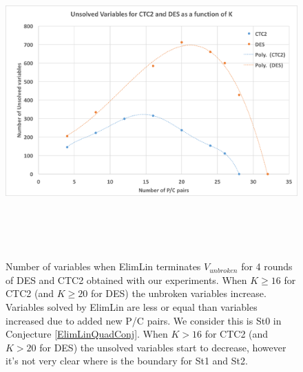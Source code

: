 \begin{figure}[!h]
	\vspace{-0.2cm}
	\centering
	\includegraphics*[width=140mm,height=12cm]{./pics/Test65.png}
	\caption [Number of variables when ElimLin terminates  $V_{unbroken}$
	for 4 rounds DES and CTC2]{Number of variables when ElimLin terminates  $V_{unbroken}$
		for 4 rounds of DES and CTC2 obtained with our experiments.
		When $K \geq 16$ for CTC2 (and $K \geq 20$ for DES) the unbroken variables increase. Variables solved by ElimLin are less or equal than variables increased due to added new P/C pairs. We consider this is St0 in
		Conjecture \ref{ElimLinQuadConj}. When $ K > 16 $ for CTC2 (and $K>20$ for DES) the unsolved variables start to decrease, however it's not very clear where is the boundary for St1 and St2.}
	\label{fig:ElimLinQuadConjExampleCTCDES}
	\vspace{-0.1cm}
\end{figure}

